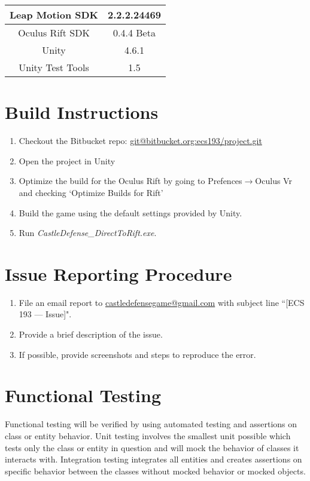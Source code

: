 \begin{table}[h]
	\renewcommand*{\arraystretch}{1.5}
	\centering
	\begin{tabular}{| c | c |}
		\hline
		Leap Motion SDK		&	2.2.2.24469\\
		\hline
		Oculus Rift SDK		&	0.4.4 Beta\\
		\hline
		Unity				&	4.6.1\\
		\hline
		Unity Test Tools	&	1.5\\
		\hline
	\end{tabular}
\end{table}


\section{Build Instructions}

\begin{enumerate}
	\item Checkout the Bitbucket repo: \url{git@bitbucket.org:ecs193/project.git}
	\item Open the project in Unity
	\item Optimize the build for the Oculus Rift by going to Prefences$\rightarrow$Oculus Vr and checking `Optimize Builds for Rift'
	\item Build the game using the default settings provided by Unity. 
	\item Run \textit{CastleDefense\_DirectToRift.exe}.
\end{enumerate}

\section{Issue Reporting Procedure}

\begin{enumerate}
	\item File an email report to \url{castledefensegame@gmail.com} with subject line ``[ECS 193 --- Issue]".
	\item Provide a brief description of the issue.
	\item If possible, provide screenshots and steps to reproduce the error.
\end{enumerate}

\section{Functional Testing}

Functional testing will be verified by using automated testing and assertions on class or entity behavior. Unit testing involves the smallest unit possible which tests only the class or entity in question and will mock the behavior of classes it interacts with. Integration testing integrates all entities and creates assertions on specific behavior between the classes without mocked behavior or mocked objects.


